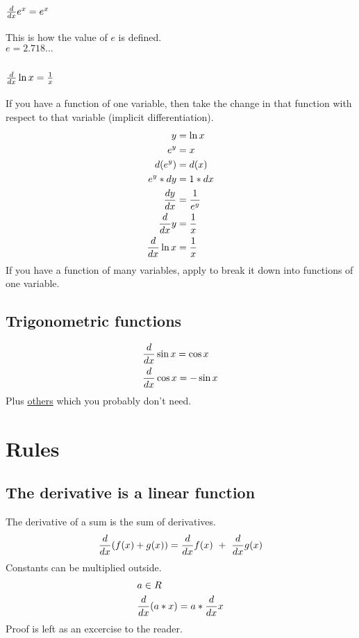 \documentclass[a4paper,14pt,twoside]{book}
\begin{document}
{\subsection{$\frac{d}{dx} e^x = e^x$}
This is how the value of $e$ is defined. \\
$e = 2.718\ldots$
\subsection{$\frac{d}{dx} \ln{x} = \frac{1}{x}$}
If you have a function of one variable, then take the change in that
function with respect to that variable (implicit differentiation). \\
\begin{align*}
	y           &= \ln{x} \\
	e^y         &= x \\
	d(e^y)      &= d(x) \\
	e^y * dy    &= 1*dx \\
	\frac{dy}{dx}  &= \frac{1}{e^y} \\
	\frac{d}{dx} y &= \frac{1}{x} \\
	\frac{d}{dx} \ln{x}   &= \frac{1}{x} \\
\end{align*}
If you have a function of many variables, apply  to
break it down into functions of one variable. \\
\pagebreak
\subsection{Trigonometric functions}
\begin{align*}
	&\frac{d}{dx} \sin{x} = \cos{x}  \\
	&\frac{d}{dx} \cos{x} = -\sin{x}
\end{align*}
Plus \href{https://www.priklady.eu/cs/matematika/derivace/derivace-funkce.alej}{others} which you probably don't need. \\
\section{Rules} \label{sec:Rules}
\subsection{The derivative is a linear function}
The derivative of a sum is the sum of derivatives. \\
\begin{align*}
	&\frac{d}{dx} (f(x) + g(x)) = \frac{d}{dx} f(x) \  + \  \frac{d}{dx} g(x) \\
\end{align*}
Constants can be multiplied outside. \\
\begin{align*}
	&a \in R \\
	&\frac{d}{dx} (a*x) = a * \frac{d}{dx} x \\
\end{align*}
Proof is left as an excercise to the reader. \\
\pagebreak
}
\end{document}
